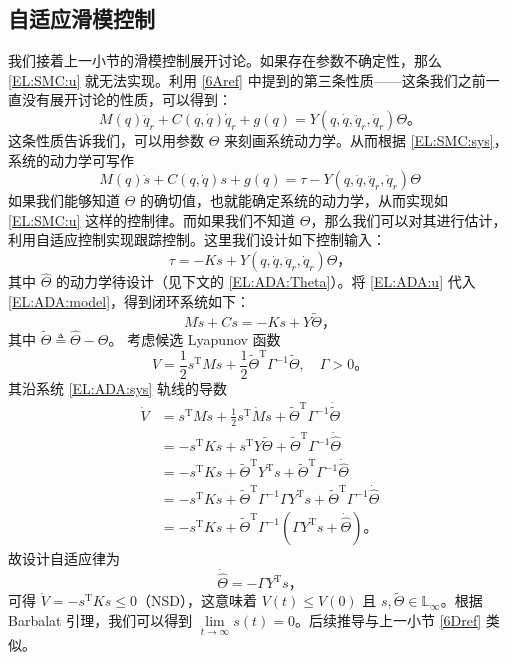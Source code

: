 \subsection{自适应滑模控制}\label{6Eref}

我们接着上一小节的滑模控制展开讨论。如果存在参数不确定性，那么 \eqref{EL:SMC:u} 就无法实现。利用 \ref{6Aref} 中提到的第三条性质——这条我们之前一直没有展开讨论的性质，可以得到：
\[
    M (q) \ddot{q}_r + C (q, \dot{q}) \dot{q}_r +g(q)= Y (q, \dot{q}, \ddot{q}_r, \dot{q}_r) \Theta \text{。}
\]
这条性质告诉我们，可以用参数 $\Theta$ 来刻画系统动力学。从而根据 \eqref{EL:SMC:sys}，系统的动力学可写作
\begin{equation} \label{EL:ADA:model}
    M(q) \dot{s} + C(q, \dot{q}) s +g(q)= \tau - Y (q, \dot{q}, \ddot{q}_r, \dot{q}_r) \Theta
\end{equation}
如果我们能够知道 $\Theta$ 的确切值，也就能确定系统的动力学，从而实现如 \eqref{EL:SMC:u} 这样的控制律。而如果我们不知道 $\Theta$，那么我们可以对其进行估计，利用自适应控制实现跟踪控制。这里我们设计如下控制输入：
\begin{equation} \label{EL:ADA:u}
    \tau = - K s + Y (q, \dot{q}, \ddot{q}_r, \dot{q}_r) \hat{\Theta} \text{，}
\end{equation}
其中 $\hat{\Theta}$ 的动力学待设计（见下文的 \eqref{EL:ADA:Theta}）。将 \eqref{EL:ADA:u} 代入 \eqref{EL:ADA:model}，得到闭环系统如下：
\begin{equation} \label{EL:ADA:sys}
    M \dot{s} + C s = - K s + Y \tilde{\Theta} \text{，}
\end{equation}
其中 $\tilde{\Theta} \triangleq \hat{\Theta} - \Theta$。
考虑候选 Lyapunov 函数
\[
    V = \frac{1}{2} s^\mathrm{T} M  s + \frac{1}{2} \tilde{\Theta}^\mathrm{T} \Gamma^{-1} \tilde{\Theta}, \quad \Gamma > 0 \text{。}
\]
其沿系统 \eqref{EL:ADA:sys} 轨线的导数
\begin{align*}
    \dot{V} & = s^\mathrm{T} M \dot{s} + \frac{1}{2} s^\mathrm{T} \dot{M} s + \tilde{\Theta}^\mathrm{T} \Gamma^{-1} \dot{\tilde{\Theta}} \\
    & = - s^\mathrm{T} K  s + s^\mathrm{T} Y \tilde{\Theta} + \tilde{\Theta}^\mathrm{T} \Gamma^{- 1} \dot{\hat{\Theta}}\\
    & = - s^\mathrm{T} K  s + \tilde{\Theta}^\mathrm{T}   Y^\mathrm{T} s + \tilde{\Theta}^\mathrm{T} \Gamma^{- 1} \dot{\hat{\Theta}}\\
    & = - s^\mathrm{T} K  s + \tilde{\Theta}^\mathrm{T} \Gamma^{- 1} \Gamma  Y^\mathrm{T} s + \tilde{\Theta}^\mathrm{T} \Gamma^{- 1} \dot{\hat{\Theta}}\\
    & = - s^\mathrm{T} K  s + \tilde{\Theta}^\mathrm{T} \Gamma^{- 1} (\Gamma  Y^\mathrm{T} s + \dot{\hat{\Theta}} ) \text{。}
\end{align*}
故设计自适应律为
\begin{equation} \label{EL:ADA:Theta}
    \dot{\hat{\Theta}} = - \Gamma Y^\mathrm{T} s \text{，}
\end{equation}
可得 $\dot{V} = - s^\mathrm{T} K s \leq 0$（NSD），这意味着 $V (t) \leq V (0)$ 且 $s, \tilde{\Theta} \in \mathbb{L}_{\infty}$。根据 Barbalat 引理，我们可以得到 $\lim\limits_{t \rightarrow \infty} s (t) = 0$。后续推导与上一小节 \ref{6Dref} 类似。

